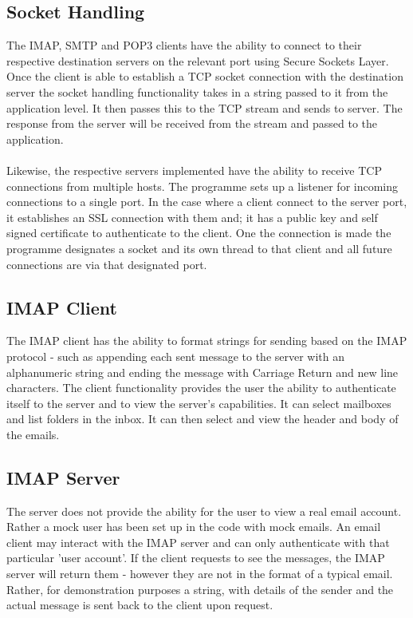 \documentclass[11pt]{article}
\begin{document}
\begin{multicols}{2}
\subsection{Socket Handling}
The IMAP, SMTP and POP3 clients have the ability to connect to their respective destination servers on the relevant port using Secure Sockets Layer. Once the client is able to establish a TCP socket connection with the destination server the socket handling functionality takes in a string passed to it from the application level. It then passes this to the TCP stream and sends to server. The response from the server will be received from the stream and passed to the application.
\\\\
Likewise, the respective servers implemented have the ability to receive TCP connections from multiple hosts. The programme sets up a listener for incoming connections to a single port. In the case where a client connect to the server port, it establishes an SSL connection with them and; it has a public key and self signed certificate to authenticate to the client. One the connection is made the programme designates a socket and its own thread to that client and all future connections are via that designated port. 
\subsection{IMAP Client}
The IMAP client has the ability to format strings for sending based on the IMAP protocol - such as appending each sent message to the server with an alphanumeric string and ending the message with Carriage Return and new line characters. The client functionality provides the user the ability to authenticate itself to the server and to view the server's capabilities. It can select mailboxes and list folders in the inbox. It can then select and view the header and body of the emails.
\subsection{IMAP Server}
The server does not provide the ability for the user to view a real email account. Rather a mock user has been set up in the code with mock emails. An email client may interact with the IMAP server and can only authenticate with that particular 'user account'. If the client requests to see the messages, the IMAP server will return them - however they are not in the format of a typical email. Rather, for demonstration purposes a string, with details of the sender and the actual message is sent back to the client upon request.

\end{multicols}
\end{document}
